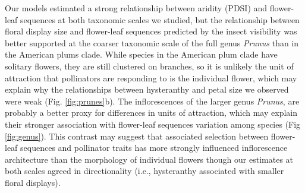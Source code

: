 \documentclass{article}[12pt]
\begin{document}
{{%


Our models estimated a strong relationship between aridity (PDSI) and flower-leaf sequences at both taxonomic scales we studied, but the relationship between floral display size and flower-leaf sequences predicted by the insect visibility was better supported at the coarser taxonomic scale of the full genus \emph{Prunus} than in the American plums clade. While species in the American plum clade have solitary flowers, they are still clustered on branches, so it is unlikely the unit of attraction that pollinators are responding to is the individual flower, which may explain why the relationships between hysteranthy and petal size we observed were weak (Fig. \ref{fig:prunes}b). The inflorescences of the larger genus \emph{Prunus}, are probably a better proxy for differences in units of attraction, which may explain their stronger association with flower-leaf sequences variation among species (Fig \ref{fig:genus}). This contrast may suggest that associated selection between flower-leaf sequences and pollinator traits has more strongly influenced inflorescence architecture than the morphology of individual flowers though our estimates at both scales agreed in directionality (i.e., hysteranthy associated with smaller floral displays).

}}
\end{document}
